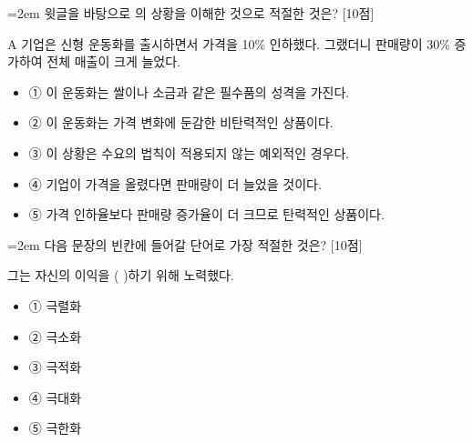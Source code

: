 \documentclass[11pt,a4paper]{article}
\newcommand{\qnum}[1]{%
  \tikz[baseline=(num.base)]{%
    \node[circle, fill=numCircle, text=white, inner sep=0pt,
          minimum size=18pt, font=\small\bfseries] (num) {#1};%
  }%
}
\newcommand{\pts}[1]{%
  \hfill\textcolor{ptsBadge}{[#1점]}%
}
\begin{document}
\vspace{4mm}
\begin{minipage}{\columnwidth}
{\hangindent=2em
\qnum{10}\enspace 윗글을 바탕으로 의 상황을 이해한 것으로 적절한 것은? \pts{10}
\par}

\vspace{3mm}
\begin{tcolorbox}[bogi]
A 기업은 신형 운동화를 출시하면서 가격을 10\% 인하했다. 그랬더니 판매량이 30\% 증가하여 전체 매출이 크게 늘었다.
\end{tcolorbox}
\vspace{3mm}
\begin{itemize}[leftmargin=2.5em, labelsep=0.3em, label={}, itemsep=4pt, parsep=1pt, topsep=0pt]
  \item ① 이 운동화는 쌀이나 소금과 같은 필수품의 성격을 가진다.
  \item ② 이 운동화는 가격 변화에 둔감한 비탄력적인 상품이다.
  \item ③ 이 상황은 수요의 법칙이 적용되지 않는 예외적인 경우다.
  \item ④ 기업이 가격을 올렸다면 판매량이 더 늘었을 것이다.
  \item ⑤ 가격 인하율보다 판매량 증가율이 더 크므로 탄력적인 상품이다.
\end{itemize}
\end{minipage}
\vspace{4mm}

\vspace{4mm}
\begin{minipage}{\columnwidth}
{\hangindent=2em
\qnum{11}\enspace 다음 문장의 빈칸에 들어갈 단어로 가장 적절한 것은? \pts{10}
\par}

\vspace{3mm}
\begin{tcolorbox}[bogi]
그는 자신의 이익을 (          )하기 위해 노력했다.
\end{tcolorbox}
\vspace{3mm}
\begin{itemize}[leftmargin=2.5em, labelsep=0.3em, label={}, itemsep=4pt, parsep=1pt, topsep=0pt]
  \item ① 극렬화
  \item ② 극소화
  \item ③ 극적화
  \item ④ 극대화
  \item ⑤ 극한화
\end{itemize}
\end{minipage}
\vspace{4mm}
\end{document}
